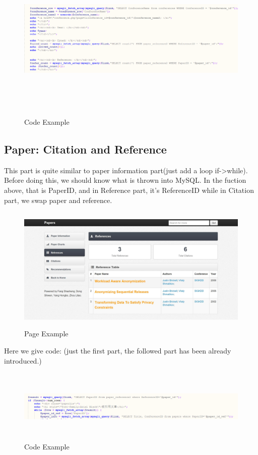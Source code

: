 \documentclass{book}
\begin{document}
\begin{figure}[H]
\centering
\includegraphics[height=8.0cm,width=17.0cm]{img/yhb_mp_2.png}
\caption{Code Example}
\end{figure}



\subsection{Paper: Citation and Reference}
This part is quite similar to paper information part(just add a loop if->while).
Before doing this, we should know what is thrown into MySQL. In the fuction above, that is PaperID, and in Reference part, it's ReferenceID while in Citation part, we swap paper and reference.

\begin{figure}[H]
\centering
\includegraphics[height=6.0cm,width=16.0cm]{img/yhb_paper_2.jpg}
\caption{Page Example}
\end{figure}
Here we give code: (just the first part, the followed part has been already introduced.)
\begin{figure}[H]
\centering
\includegraphics[height=3.5cm,width=16.0cm]{img/yhb_re_2.png}
\caption{Code Example}
\end{figure}
\end{document}
